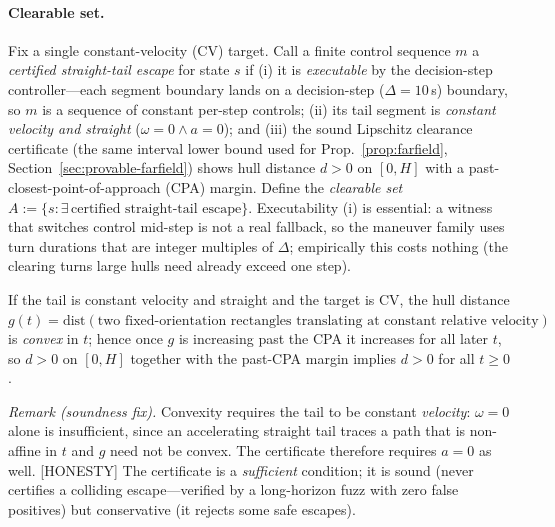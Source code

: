 \paragraph{Clearable set.} Fix a single constant-velocity (CV) target. Call a finite
control sequence $m$ a \emph{certified straight-tail escape} for state $s$ if (i) it is
\emph{executable} by the decision-step controller---each segment boundary lands on a
decision-step ($\Delta=10$\,s) boundary, so $m$ is a sequence of constant per-step
controls; (ii) its tail segment is \emph{constant velocity and straight}
($\omega=0\wedge a=0$); and (iii) the sound Lipschitz clearance certificate (the same
interval lower bound used for Prop.~\ref{prop:farfield},
Section~\ref{sec:provable-farfield}) shows hull distance $d>0$ on $[0,H]$ with a
past-closest-point-of-approach (CPA) margin. Define the \emph{clearable set}
$A:=\{s:\exists\,\text{certified straight-tail escape}\}$. Executability (i) is
essential: a witness that switches control mid-step is not a real fallback, so the
maneuver family uses turn durations that are integer multiples of $\Delta$;
empirically this costs nothing (the clearing turns large hulls need already exceed one
step).

\begin{lemma}
\label{lem:convex-tail}
If the tail is constant velocity and straight and the target is CV, the hull distance
$g(t)=\mathrm{dist}(\text{two fixed-orientation rectangles translating at constant
relative velocity})$ is \emph{convex} in $t$; hence once $g$ is increasing past the
CPA it increases for all later $t$, so $d>0$ on $[0,H]$ together with the past-CPA
margin implies $d>0$ for all $t\ge0$.
\end{lemma}
\emph{Remark (soundness fix).} Convexity requires the tail to be constant
\emph{velocity}: $\omega=0$ alone is insufficient, since an accelerating straight tail
traces a path that is non-affine in $t$ and $g$ need not be convex. The certificate
therefore requires $a=0$ as well. [HONESTY] The certificate is a \emph{sufficient}
condition; it is sound (never certifies a colliding escape---verified by a
long-horizon fuzz with zero false positives) but conservative (it rejects some safe
escapes).


